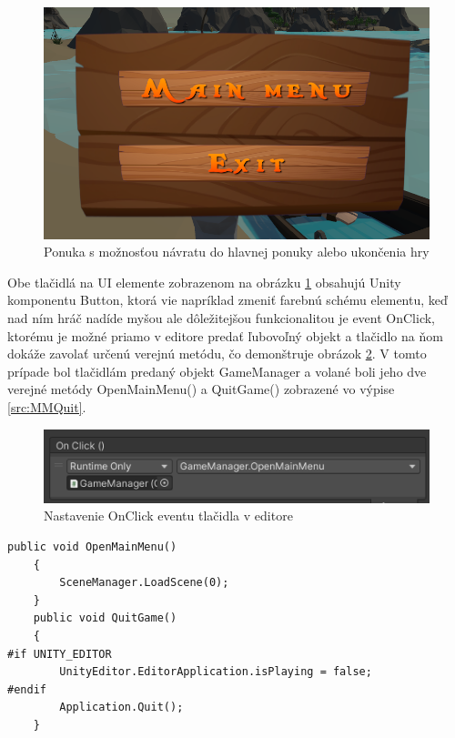 \documentclass[slovak, master]{diploma}
\begin{document}
\begin{figure}[!htbp]
	\centering
	\includegraphics[width=.8\textwidth]{Figures/pauseUI.png}
	\caption{Ponuka s možnosťou návratu do hlavnej ponuky alebo ukončenia hry}
	\label{pic:PauseUI}
\end{figure}

Obe tlačidlá na UI elemente zobrazenom na obrázku \ref{pic:PauseUI} obsahujú Unity komponentu Button, ktorá vie napríklad zmeniť farebnú schému elementu, keď nad ním hráč nadíde myšou ale dôležitejšou funkcionalitou je event OnClick, ktorému je možné priamo v editore predať ľubovoľný objekt a tlačidlo na ňom dokáže zavolať určenú verejnú metódu, čo demonštruje obrázok \ref{pic:OnClick}. V tomto prípade bol tlačidlám predaný objekt GameManager a volané boli jeho dve verejné metódy OpenMainMenu() a QuitGame() zobrazené vo výpise \ref{src:MMQuit}. 

\begin{figure}[!htbp]
	\centering
	\includegraphics[width=.8\textwidth]{Figures/OnClick.png}
	\caption{Nastavenie OnClick eventu tlačidla v editore}
	\label{pic:OnClick}
\end{figure}

\vspace{8pt}
\begin{lstlisting}[label=src:MMQuit,caption={Metódy na návrat do hlavnej ponuky a ukončenie hry}]
public void OpenMainMenu()
    {
        SceneManager.LoadScene(0);
    }
    public void QuitGame()
    {
#if UNITY_EDITOR
        UnityEditor.EditorApplication.isPlaying = false;
#endif
        Application.Quit();
    }
\end{lstlisting}
\end{document}
